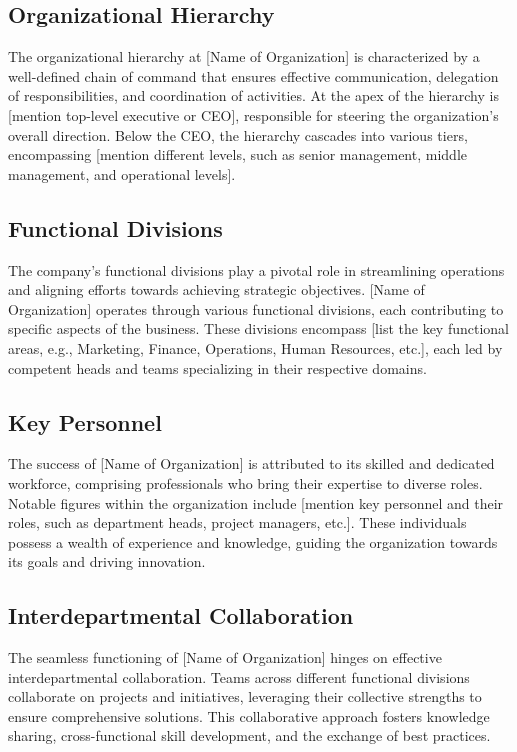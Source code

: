 \subsection{Organizational Hierarchy}
The organizational hierarchy at [Name of Organization] is characterized by a well-defined chain of command that ensures effective communication, delegation of responsibilities, and coordination of activities. At the apex of the hierarchy is [mention top-level executive or CEO], responsible for steering the organization's overall direction. Below the CEO, the hierarchy cascades into various tiers, encompassing [mention different levels, such as senior management, middle management, and operational levels].

\subsection{Functional Divisions}
The company's functional divisions play a pivotal role in streamlining operations and aligning efforts towards achieving strategic objectives. [Name of Organization] operates through various functional divisions, each contributing to specific aspects of the business. These divisions encompass [list the key functional areas, e.g., Marketing, Finance, Operations, Human Resources, etc.], each led by competent heads and teams specializing in their respective domains.

\subsection{Key Personnel}
The success of [Name of Organization] is attributed to its skilled and dedicated workforce, comprising professionals who bring their expertise to diverse roles. Notable figures within the organization include [mention key personnel and their roles, such as department heads, project managers, etc.]. These individuals possess a wealth of experience and knowledge, guiding the organization towards its goals and driving innovation.

\subsection{Interdepartmental Collaboration}
The seamless functioning of [Name of Organization] hinges on effective interdepartmental collaboration. Teams across different functional divisions collaborate on projects and initiatives, leveraging their collective strengths to ensure comprehensive solutions. This collaborative approach fosters knowledge sharing, cross-functional skill development, and the exchange of best practices.

